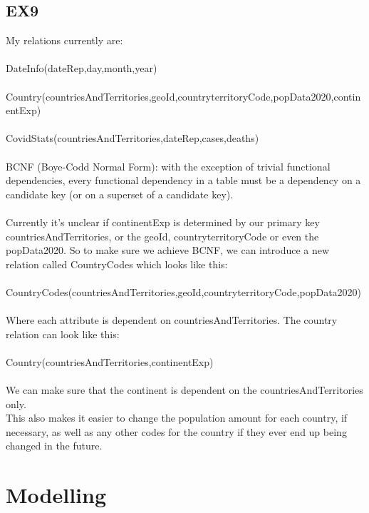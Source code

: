 \documentclass[]{article}
\begin{document}
\subsection{EX9}
My relations currently are:\\
\\DateInfo(dateRep,day,month,year)\\
\\Country(countriesAndTerritories,geoId,countryterritoryCode,popData2020,continentExp)\\
\\CovidStats(countriesAndTerritories,dateRep,cases,deaths)\\
\\BCNF (Boye-Codd Normal Form): with the exception of trivial functional dependencies, every functional dependency in a table must be a dependency on a candidate key (or on a superset of a candidate key).\\
\\Currently it's unclear if continentExp is determined by our primary key countriesAndTerritories, or the geoId, countryterritoryCode or even the popData2020. So to make sure we achieve BCNF, we can introduce a new relation called CountryCodes which looks like this:\\
\\CountryCodes(countriesAndTerritories,geoId,countryterritoryCode,popData2020)\\
\\Where each attribute is dependent on countriesAndTerritories. The country relation can look like this:\\
\\Country(countriesAndTerritories,continentExp)\\
\\We can make sure that the continent is dependent on the countriesAndTerritories only.\\
This also makes it easier to change the population amount for each country, if necessary, as well as any other codes for the country if they ever end up being changed in the future.

\section{Modelling}
\end{document}
